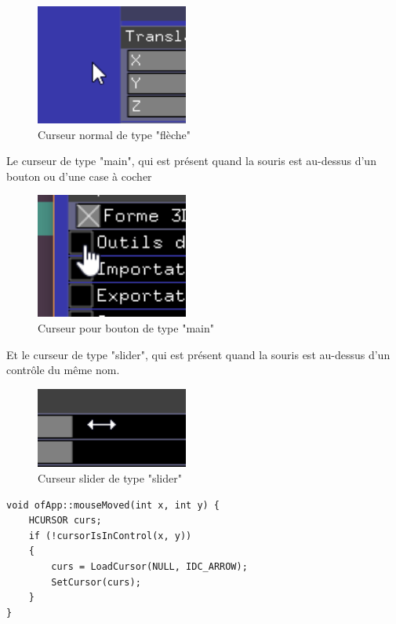 \begin{figure}[h]
	\centering
	\includegraphics[width=5cm]{fig/curseurNormal.png}
	\caption{Curseur normal de type "flèche"}
	\label{fig:curseurNormal}
\end{figure}

Le curseur de type "main", qui est présent quand la souris est au-dessus d'un bouton ou d'une case à cocher

\begin{figure}[h]
	\centering
	\includegraphics[width=5cm]{fig/curseurBouton.png}
	\caption{Curseur pour bouton de type "main"}
	\label{fig:curseurBouton}
\end{figure}

Et le curseur de type "slider", qui est présent quand la souris est au-dessus d'un contrôle du même nom.

\begin{figure}[h]
	\centering
	\includegraphics[width=5cm]{fig/curseurSlider.png}
	\caption{Curseur slider de type "slider"}
	\label{fig:curseurSlider}
\end{figure}

\begin{lstlisting}
void ofApp::mouseMoved(int x, int y) {
	HCURSOR curs;
	if (!cursorIsInControl(x, y))
	{
		curs = LoadCursor(NULL, IDC_ARROW);
		SetCursor(curs);
	}
}
\end{lstlisting}

